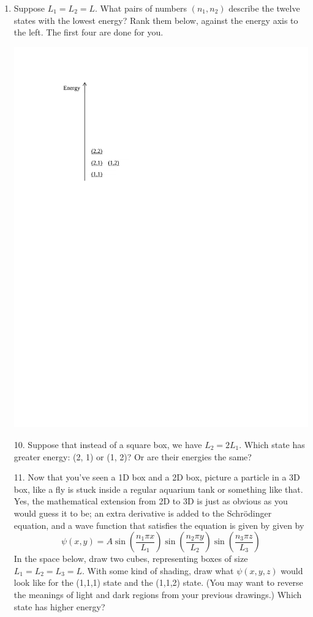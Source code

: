 \begin{enumerate}[wide]
\item Suppose $L_1=L_2=L$.   What pairs of numbers $(n_1,n_2)$ describe the twelve states with the lowest energy?  Rank them below, against the energy axis to the left.  The first four are done for you.
\begin{center}
\includegraphics[scale=0.8]{particle_in_2d_box/2d_box_energies.pdf}
\end{center}

10.  Suppose that instead of a square box, we have $L_2=2L_1$.  Which state has greater energy: (2, 1) or (1, 2)?  Or are their energies the same?
\answerspace{0.6in}

11.  Now that you've seen a 1D box and a 2D box, picture a particle in a 3D box, like a fly is stuck inside a regular aquarium tank or something like that.  Yes, the mathematical extension from 2D to 3D is just as obvious as you would guess it to be; an extra derivative is added to the Schr\"odinger equation, and a wave function that satisfies the equation is given by given by
$$\displaystyle\psi(x,y)=A\sin\left(\frac{n_1\pi x}{L_1}\right)\sin\left(\frac{n_2\pi y}{L_2}\right)\sin\left(\frac{n_3\pi z}{L_3}\right)$$
In the space below, draw two cubes, representing boxes of size $L_1=L_2=L_3=L$.  With some kind of shading, draw what $\psi(x,y,z)$ would look like for the (1,1,1) state and the (1,1,2) state.  (You may want to reverse the meanings of light and dark regions from your previous drawings.) Which state has higher energy?
\answerspace{1.6in}

\end{enumerate}
